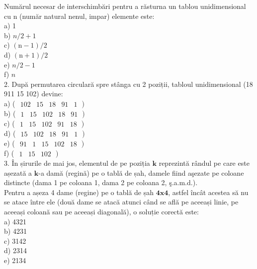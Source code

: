 \documentclass[10pt]{article}
\begin{document}
Numărul necesar de interschimbări pentru a răsturna un tablou unidimensional cu n (număr natural nenul, impar) elemente este:\\
a) 1\\
b) $n / 2+1$\\
c) $(\mathrm{n}-1) / 2$\\
d) $(\mathrm{n}+1) / 2$\\
e) $n / 2-1$\\
f) $n$\\
2. După permutarea circulară spre stânga cu 2 poziții, tabloul unidimensional (18 911 15 102) devine:\\
a) ( $\left.\begin{array}{lllll}102 & 15 & 18 & 91 & 1\end{array}\right)$\\
b) ( $\left.\begin{array}{lllll}1 & 15 & 102 & 18 & 91\end{array}\right)$\\
c) ( $\left.\begin{array}{lllll}1 & 15 & 102 & 91 & 18\end{array}\right)$\\
d) ( $\left.\begin{array}{lllll}15 & 102 & 18 & 91 & 1\end{array}\right)$\\
e) ( $\left.\begin{array}{lllll}91 & 1 & 15 & 102 & 18\end{array}\right)$\\
f) ( $\left.\begin{array}{lll}1 & 15 & 102\end{array}\right)$\\
3. În șirurile de mai jos, elementul de pe poziția $\mathbf{k}$ reprezintă rândul pe care este așezată a $\mathbf{k}$-a damă (regină) pe o tablă de șah, damele fiind aşezate pe coloane distincte (dama 1 pe coloana 1, dama 2 pe coloana 2, ş.a.m.d.).\\
Pentru a așeza 4 dame (regine) pe o tablă de șah $\mathbf{4 x 4}$, astfel încât acestea să nu se atace între ele (două dame se atacă atunci când se află pe aceeași linie, pe aceeași coloană sau pe aceeași diagonală), o soluție corectă este:\\
a) 4321\\
b) 4231\\
c) 3142\\
d) 2314\\
e) 2134\\
\end{document}
